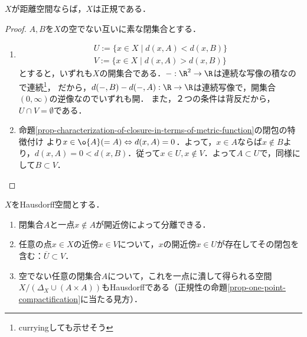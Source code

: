 \documentclass[uplatex,dvipdfmx]{jsreport}
\begin{document}
\begin{proposition}\label{prop-metric-space-is-normal}
    $X$が距離空間ならば，$X$は正規である．
\end{proposition}
\begin{proof}
    $A,B$を$X$の空でない互いに素な閉集合とする．
    \begin{enumerate}
        \item \begin{align*}
            U:=\{x\in X\mid d(x,A)<d(x,B)\}\\
            V:=\{x\in X\mid d(x,A)>d(x,B)\}
        \end{align*}
        とすると，いずれも$X$の開集合である．$-:\R^2\to\R$は連続な写像の積なので連続\footnote{curryingしても示せそう}，
        だから，$d(-,B)-d(-,A):\R\to\R$は連続写像で，開集合$(0,\infty)$の逆像なのでいずれも開．
        また，２つの条件は背反だから，$U\cap V=\emptyset$である．
        \item 命題\ref{prop-characterization-of-closure-in-terms-of-metric-function}の閉包の特徴付け
        より$x\in\o{A}(=A)\Leftrightarrow d(x,A)=0$．よって，$x\in A$ならば$x\notin B$より，$d(x,A)=0<d(x,B)$．従って$x\in U,x\notin V$．よって$A\subset U$で，同様にして$B\subset V$．
    \end{enumerate}
\end{proof}

\begin{proposition}[正則性の特徴付け]
    $X$をHausdorff空間とする．
    \begin{enumerate}
        \item 閉集合$A$と一点$x\notin A$が開近傍によって分離できる．
        \item 任意の点$x\in X$の近傍$x\in V$について，$x$の開近傍$x\in U$が存在してその閉包を含む：$\overline{U}\subset V$．
        \item 空でない任意の閉集合$A$について，これを一点に潰して得られる空間$X/(\Delta_X\cup(A\times A))$もHausdorffである（正規性の命題\ref{prop-one-point-compactification}に当たる見方）．
    \end{enumerate}
\end{proposition}
\end{document}
